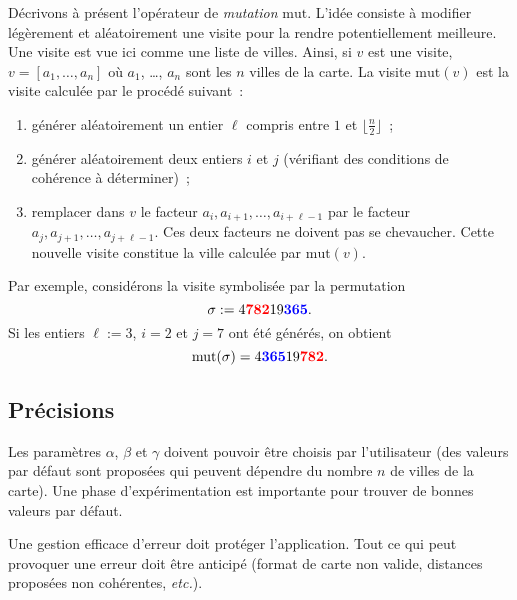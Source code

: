 \documentclass[12pt]{article}
\theoremstyle{definition}
\newcommand{\Mut}{\mathrm{mut}}
\begin{document}
Décrivons à présent l'opérateur de {\em mutation} $\Mut$. L'idée
consiste à modifier légèrement et aléatoirement une visite pour la
rendre potentiellement meilleure. Une visite est vue ici comme une liste
de villes. Ainsi, si $v$ est une visite, $v = [a_1, \dots, a_n]$ où
$a_1$, \dots, $a_n$ sont les $n$ villes de la carte. La visite $\Mut(v)$
est la visite calculée par le procédé suivant~:
\begin{enumerate}
    \item générer aléatoirement un entier $\ell$ compris entre $1$
    et $\lfloor\frac{n}{2}\rfloor$~;
    \smallskip

    \item générer aléatoirement deux entiers $i$ et $j$ (vérifiant des
    conditions de cohérence à déterminer)~;
    \smallskip

    \item remplacer dans $v$ le facteur
    $a_i, a_{i + 1}, \dots, a_{i + \ell - 1}$ par le facteur
    $a_j, a_{j + 1}, \dots, a_{j + \ell - 1}$. Ces deux facteurs ne
    doivent pas se chevaucher. Cette nouvelle
    visite constitue la ville calculée par $\Mut(v)$.
\end{enumerate}
Par exemple, considérons la visite symbolisée par la permutation
\begin{equation*}
    \sigma := 4 \textcolor{red}{\bf 782} 19 \textcolor{blue}{\bf 365}.
\end{equation*}
Si les entiers $\ell := 3$, $i = 2$ et $j = 7$ ont été générés,
on obtient
\begin{equation*}
    \Mut(\sigma) =
    4 \textcolor{blue}{\bf 365} 19 \textcolor{red}{\bf 782}.
\end{equation*}
\medskip

\subsection*{\centering Précisions}
Les paramètres $\alpha$, $\beta$ et $\gamma$ doivent pouvoir être
choisis par l'utilisateur (des valeurs par défaut sont proposées qui
peuvent dépendre du nombre $n$ de villes de la carte). Une phase
d'expérimentation est importante pour trouver de bonnes valeurs par
défaut.
\medskip

Une gestion efficace d'erreur doit protéger l'application. Tout ce qui
peut provoquer une erreur doit être anticipé (format de carte non valide,
distances proposées non cohérentes, {\em etc.}).
\medskip
\end{document}
